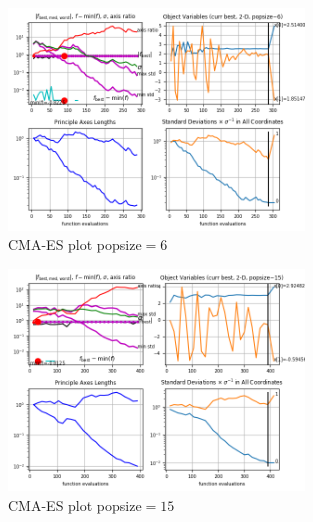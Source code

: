 \documentclass[12 pt, a4paper]{article}
\begin{document}
\begin{figure}[h]
\centering
\includegraphics[width = 0.7\textwidth]{CMA_plot_pp_size6.png}
\caption{CMA-ES plot popsize$=6$}
\label{fig:cma6}
\end{figure}


\begin{figure}[h]
\centering
\includegraphics[width = 0.7\textwidth]{CMA_plot_pp_size15.png}
\caption{CMA-ES plot popsize$=15$}
\label{fig:cma15}
\end{figure}
\quad



\end{document}
